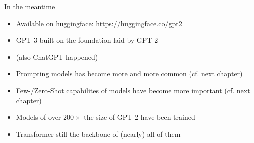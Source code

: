 
\begin{frame}{In the meantime}

\vfill

\begin{itemize}
	\item Available on huggingface: \url{https://huggingface.co/gpt2}
	\item GPT-3 built on the foundation laid by GPT-2
	\item (also ChatGPT happened)
	\item Prompting models has become more and more common (cf. next chapter)
	\item Few-/Zero-Shot capabilites of models have become more important (cf. next chapter)
	\item Models of over $200\times$ the size of GPT-2 have been trained
	\item Transformer still the backbone of (nearly) all of them
\end{itemize}

\vfill

\end{frame}


\endlecture

